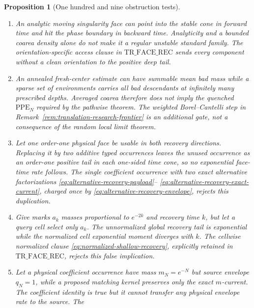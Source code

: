 \documentclass[11pt]{article}
\newtheorem{proposition}[theorem]{Proposition}
\begin{document}
\begin{proposition}[One hundred and nine obstruction tests]
\begin{enumerate}[label=\textup{(T\arabic*)}]
      truncated function can have a good $r$-sublevel estimate while the
      actual slope is shifted across the entire window.  The same-scale
      remainder bound
      \eqref{eq:translation-finite-holonomy-truncation} rejects this
      substitution of analytic finite words for the actual slope.
\item An analytic moving singularity face can point into the stable cone in
      forward time and hit the phase boundary in backward time.  Analyticity
      and a bounded coarea density alone do not make it a regular unstable
      standard family.  The orientation-specific access clause in
      $\mathrm{TR\_FACE\_REC}$ sends every component without a clean
      orientation to the positive deep tail.
\item An annealed fresh-center estimate can have summable mean bad mass while
      a sparse set of environments carries all bad descendants at infinitely
      many prescribed depths.  Averaged coarea therefore does not imply the
      quenched $\mathrm{PPE}_{N}$ required by the pathwise theorem.  The
      weighted Borel--Cantelli step in
      Remark~\ref{rem:translation-research-frontier} is an additional gate,
      not a consequence of the random local limit theorem.
\item Let one order-one physical face be usable in both recovery directions.
      Replacing it by two additive typed occurrences leaves the unused
      occurrence as an order-one positive tail in each one-sided time cone,
      so no exponential face-time rate follows.  The single coefficient
      occurrence with two exact alternative factorizations
      \eqref{eq:alternative-recovery-payload}--
      \eqref{eq:alternative-recovery-exact-current}, charged once by
      \eqref{eq:alternative-recovery-envelope}, rejects this duplication.
\item Give marks $a_k$ masses proportional to $e^{-2k}$ and recovery time
      $k$, but let a query cell select only $a_k$.  The unnormalized global
      recovery tail is exponential while the normalized cell exponential
      moment diverges with $k$.  The cellwise normalized clause
      \eqref{eq:normalized-shallow-recovery}, explicitly retained in
      $\mathrm{TR\_FACE\_REC}$, rejects this false implication.
\item Let a physical coefficient occurrence have mass $m_N=e^{-N}$ but
      source envelope $q_N=1$, while a proposed matching kernel preserves
      only the exact $m$-current.  The coefficient identity is true but it
      cannot transfer any physical envelope rate to the source.  The

\end{enumerate}
\end{proposition}
\end{document}
